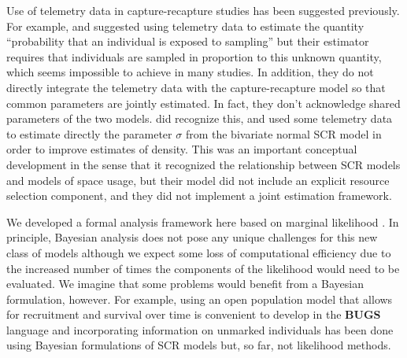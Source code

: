 \documentclass[12pt]{article}
\begin{document}
Use of telemetry data in capture-recapture studies has been suggested
previously. For example, \citet{white_shenk:2001} and
\citet{ivan:2012} suggested using telemetry data to estimate the
quantity ``probability that an individual is exposed to sampling'' but
their estimator requires that individuals are sampled in proportion to
this unknown quantity, which seems impossible to achieve in many
studies. In addition, they do not directly integrate the telemetry
data with the capture-recapture model so that common parameters are
jointly estimated. In fact, they don't acknowledge shared
parameters of the two models.  \citet{sollmann_etal:inprep} did
recognize this, and used some telemetry data to estimate directly the
parameter $\sigma$ from the bivariate normal SCR model in order to
improve estimates of density. This was an important conceptual
development in the sense that it recognized the relationship between
SCR models and models of space usage, but their model did not include
an explicit resource selection component, and they did not implement a
joint estimation framework.


We developed a formal analysis framework here based on marginal
likelihood \citep{borchers_efford:2008}.
In principle, Bayesian analysis does not pose any unique challenges
for this new class of models although we expect some loss of
computational efficiency due to the increased number of times the
components of the likelihood would need to be evaluated.  We imagine
that some problems would benefit from a Bayesian formulation,
however. For example, using an open population model that allows for
recruitment and survival over time \citep{gardner_etal:2010ecol} is
convenient to develop in the {\bf BUGS} language and incorporating
information on unmarked individuals has been done using Bayesian
formulations of SCR models \citep{chandler_royle:2012,
  sollmann_etal:inprep} but, so far, not likelihood methods.
\end{document}
